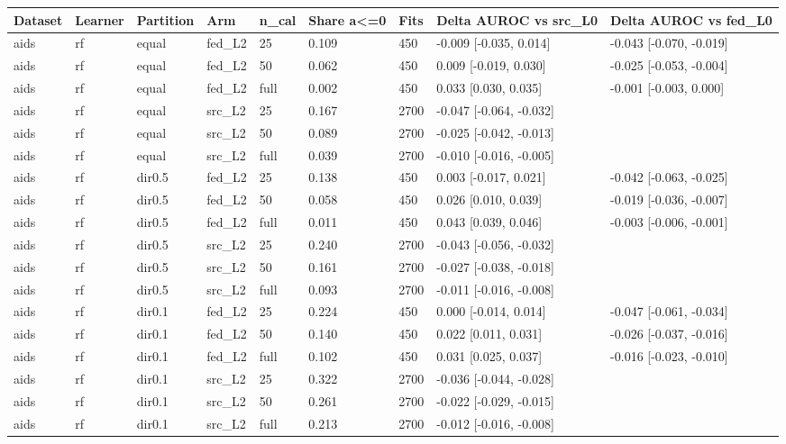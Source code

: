 \begin{tabular}{lllllllll}
\toprule
Dataset & Learner & Partition & Arm & n\_cal & Share a<=0 & Fits & Delta AUROC vs src\_L0 & Delta AUROC vs fed\_L0 \\
\midrule
aids & rf & equal & fed\_L2 & 25 & 0.109 & 450 & -0.009 [-0.035, 0.014] & -0.043 [-0.070, -0.019] \\
aids & rf & equal & fed\_L2 & 50 & 0.062 & 450 & 0.009 [-0.019, 0.030] & -0.025 [-0.053, -0.004] \\
aids & rf & equal & fed\_L2 & full & 0.002 & 450 & 0.033 [0.030, 0.035] & -0.001 [-0.003, 0.000] \\
aids & rf & equal & src\_L2 & 25 & 0.167 & 2700 & -0.047 [-0.064, -0.032] &  \\
aids & rf & equal & src\_L2 & 50 & 0.089 & 2700 & -0.025 [-0.042, -0.013] &  \\
aids & rf & equal & src\_L2 & full & 0.039 & 2700 & -0.010 [-0.016, -0.005] &  \\
aids & rf & dir0.5 & fed\_L2 & 25 & 0.138 & 450 & 0.003 [-0.017, 0.021] & -0.042 [-0.063, -0.025] \\
aids & rf & dir0.5 & fed\_L2 & 50 & 0.058 & 450 & 0.026 [0.010, 0.039] & -0.019 [-0.036, -0.007] \\
aids & rf & dir0.5 & fed\_L2 & full & 0.011 & 450 & 0.043 [0.039, 0.046] & -0.003 [-0.006, -0.001] \\
aids & rf & dir0.5 & src\_L2 & 25 & 0.240 & 2700 & -0.043 [-0.056, -0.032] &  \\
aids & rf & dir0.5 & src\_L2 & 50 & 0.161 & 2700 & -0.027 [-0.038, -0.018] &  \\
aids & rf & dir0.5 & src\_L2 & full & 0.093 & 2700 & -0.011 [-0.016, -0.008] &  \\
aids & rf & dir0.1 & fed\_L2 & 25 & 0.224 & 450 & 0.000 [-0.014, 0.014] & -0.047 [-0.061, -0.034] \\
aids & rf & dir0.1 & fed\_L2 & 50 & 0.140 & 450 & 0.022 [0.011, 0.031] & -0.026 [-0.037, -0.016] \\
aids & rf & dir0.1 & fed\_L2 & full & 0.102 & 450 & 0.031 [0.025, 0.037] & -0.016 [-0.023, -0.010] \\
aids & rf & dir0.1 & src\_L2 & 25 & 0.322 & 2700 & -0.036 [-0.044, -0.028] &  \\
aids & rf & dir0.1 & src\_L2 & 50 & 0.261 & 2700 & -0.022 [-0.029, -0.015] &  \\
aids & rf & dir0.1 & src\_L2 & full & 0.213 & 2700 & -0.012 [-0.016, -0.008] &  \\

\end{tabular}

